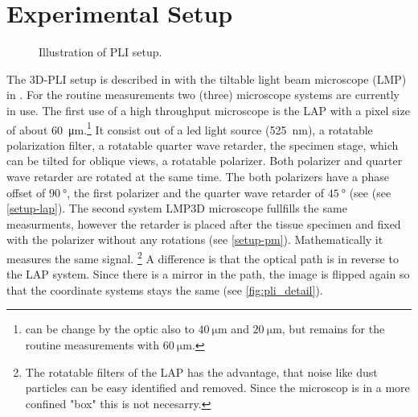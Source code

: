 \section{Experimental Setup}\label{sec:expSetup}
%
\begin{figure}[!t]
    \captionsetup[sub]{position=top}
    \setlength{\tikzwidth}{\textwidth}
	\centering
	\caption{Illustration of PLI setup.}
	\label{fig:pli_setup}
\end{figure}
%
%
The \ac{3D-PLI} setup is described in \cite{Axer2011} with the tiltable light beam microscope (LMP) in \cite{Wiese:887678}.
For the routine measurements two (three) microscope systems are currently in use.
The first use of a high throughput microscope is the \ac{LAP} with a pixel size of about \SI{60}{\micro\meter}.\footnote{can be change by the optic also to $\SI{40}{\micro\meter}$ and $\SI{20}{\micro\meter}$, but remains for the routine measurements with $\SI{60}{\micro\meter}$.}
It consist out of a led light source (\SI{525}{\nano\meter}), a rotatable polarization filter, a rotatable quarter wave retarder, the specimen stage, which can be tilted for oblique views, a rotatable polarizer.
Both polarizer and quarter wave retarder are rotated at the same time.
The both polarizers have a phase offset of $\SI{90}{\degree}$, the first polarizer and the quarter wave retarder of $\SI{45}{\degree}$ (see (see \cref{setup-lap}).
The second system \ac{LMP3D} microscope fullfills the same measurments, however the retarder is placed after the tissue specimen and fixed with the polarizer without any rotations (see \cref{setup-pm}).
Mathematically it measures the same signal.
\footnote{The rotatable filters of the \ac{LAP} has the advantage, that noise like dust particles can be easy identified and removed. Since the microscop is in a more confined "box" this is not necesarry.}
A difference is that the optical path is in reverse to the \ac{LAP} system.
Since there is a mirror in the path, the image is flipped again so that the coordinate systems stays the same (see \cref{fig:pli_detail}).
% 
